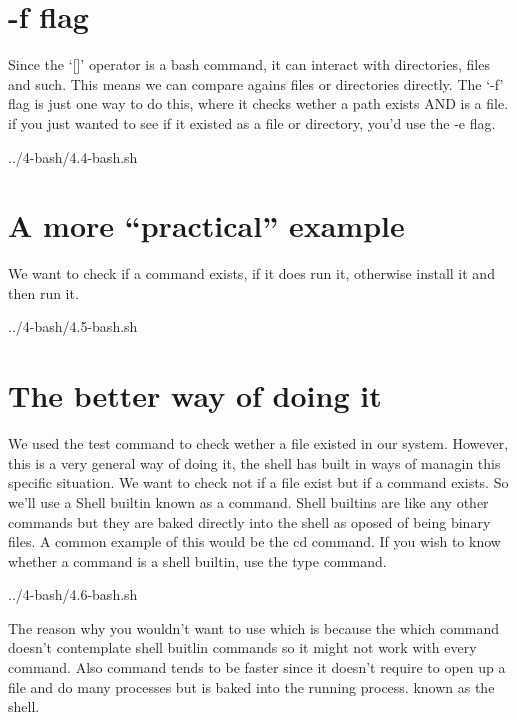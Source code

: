 \section{-f flag}

Since the `[]' operator is a bash command, it can interact with directories, files and such.
This means we can compare agains files or directories directly. The `-f' flag is just one way
to do this, where it checks wether a path exists AND is a file. if you just wanted to see if 
it existed as a file or directory, you'd use the -e flag.


{../4-bash/4.4-bash.sh}
\pagebreak
\section{A more ``practical'' example}

We want to check if a command exists, if it does run it, otherwise install it and then run it.


{../4-bash/4.5-bash.sh}

\section{The better way of doing it}

We used the test command to check wether a file existed in our system. However, this is a very
general way of doing it, the shell has built in ways of managin this specific situation.
We want to check not if a file exist but if a command exists. So we'll use a Shell builtin
known as a command. Shell builtins are like any other commands but they are baked directly into
the shell as oposed of being binary files. A common example of this would be the cd command.
If you wish to know whether a command is a shell builtin, use the type command.


{../4-bash/4.6-bash.sh}

The reason why you wouldn't want to use which is because the which command doesn't contemplate 
shell buitlin commands so it might not work with every command. Also command tends to be faster 
since it doesn't require to open up a file and do many processes but is baked into the running process.
known as the shell.
\pagebreak

